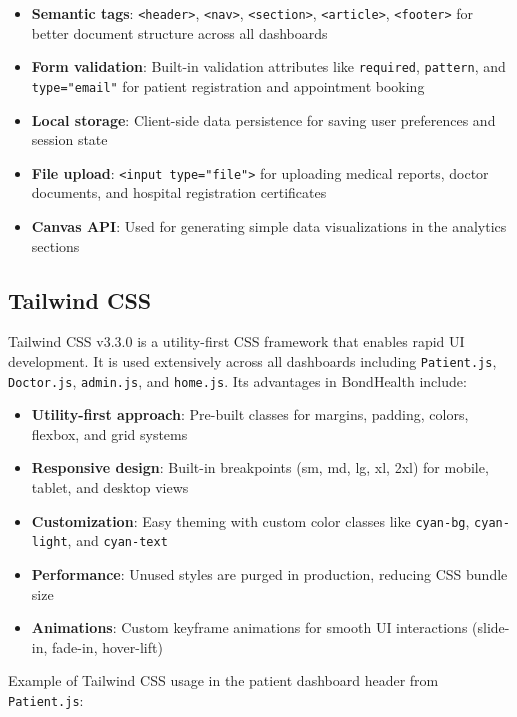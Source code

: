 \begin{itemize}
    \item \textbf{Semantic tags}: \texttt{<header>}, \texttt{<nav>}, \texttt{<section>}, \texttt{<article>}, \texttt{<footer>} for better document structure across all dashboards
    \item \textbf{Form validation}: Built-in validation attributes like \texttt{required}, \texttt{pattern}, and \texttt{type="email"} for patient registration and appointment booking
    \item \textbf{Local storage}: Client-side data persistence for saving user preferences and session state
    \item \textbf{File upload}: \texttt{<input type="file">} for uploading medical reports, doctor documents, and hospital registration certificates
    \item \textbf{Canvas API}: Used for generating simple data visualizations in the analytics sections
\end{itemize}

\subsection{Tailwind CSS}
Tailwind CSS v3.3.0 is a utility-first CSS framework that enables rapid UI development. It is used extensively across all dashboards including \texttt{Patient.js}, \texttt{Doctor.js}, \texttt{admin.js}, and \texttt{home.js}. Its advantages in BondHealth include:

\begin{itemize}
    \item \textbf{Utility-first approach}: Pre-built classes for margins, padding, colors, flexbox, and grid systems
    \item \textbf{Responsive design}: Built-in breakpoints (sm, md, lg, xl, 2xl) for mobile, tablet, and desktop views
    \item \textbf{Customization}: Easy theming with custom color classes like \texttt{cyan-bg}, \texttt{cyan-light}, and \texttt{cyan-text}
    \item \textbf{Performance}: Unused styles are purged in production, reducing CSS bundle size
    \item \textbf{Animations}: Custom keyframe animations for smooth UI interactions (slide-in, fade-in, hover-lift)
\end{itemize}

Example of Tailwind CSS usage in the patient dashboard header from \texttt{Patient.js}:


